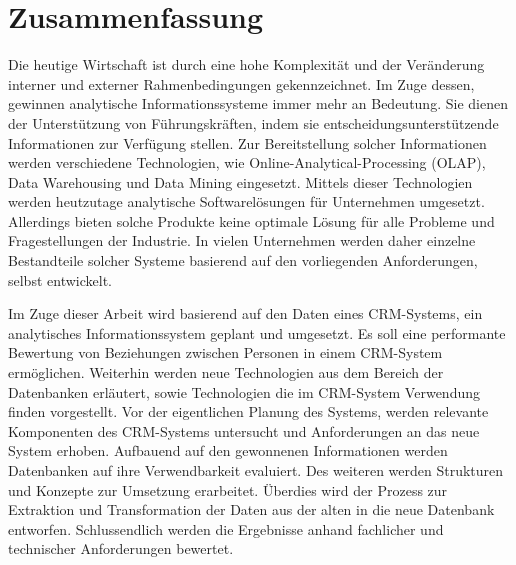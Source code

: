 
\chapter*{\centering Zusammenfassung}

Die heutige Wirtschaft ist durch eine hohe Komplexität und der Veränderung interner und externer Rahmenbedingungen gekennzeichnet. Im Zuge dessen, gewinnen analytische Informationssysteme immer mehr an Bedeutung. Sie dienen der Unterstützung von Führungskräften, indem sie entscheidungsunterstützende Informationen zur Verfügung stellen. Zur Bereitstellung solcher Informationen werden verschiedene Technologien, wie Online-Analytical-Processing (OLAP), Data Warehousing und Data Mining eingesetzt. Mittels dieser Technologien werden heutzutage analytische Softwarelösungen für Unternehmen umgesetzt. Allerdings bieten solche Produkte keine optimale Lösung für alle Probleme und Fragestellungen der Industrie. In vielen Unternehmen werden daher einzelne Bestandteile solcher Systeme basierend auf den vorliegenden Anforderungen, selbst entwickelt.

Im Zuge dieser Arbeit wird basierend auf den Daten eines CRM-Systems, ein analytisches Informationssystem geplant und umgesetzt. Es soll eine performante Bewertung von Beziehungen zwischen Personen in einem CRM-System ermöglichen. Weiterhin werden neue Technologien aus dem Bereich der Datenbanken erläutert, sowie Technologien die im CRM-System Verwendung finden vorgestellt. Vor der eigentlichen Planung des Systems, werden relevante Komponenten des CRM-Systems untersucht und Anforderungen an das neue System erhoben. Aufbauend auf den gewonnenen Informationen werden Datenbanken auf ihre Verwendbarkeit evaluiert. Des weiteren werden Strukturen und Konzepte zur Umsetzung erarbeitet. Überdies wird der Prozess zur Extraktion und Transformation der Daten aus der alten in die neue Datenbank entworfen. Schlussendlich werden die Ergebnisse anhand fachlicher und technischer Anforderungen bewertet.